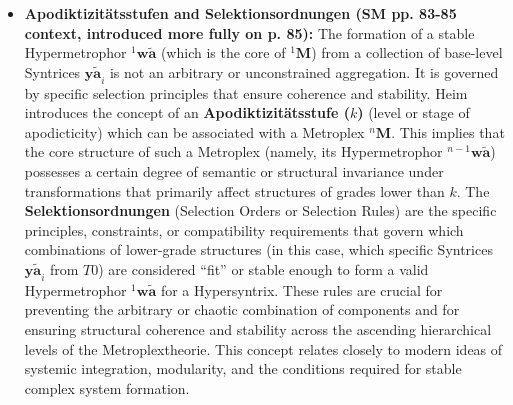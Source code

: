 \documentclass[12pt]{article}
\newcommand{\q}[1]{\enquote{#1}}
\newcommand{\syntrix}{\bm{y\widetilde{a}}}
\newcommand{\aspektivsystem}{P}
\newcommand{\syntrixtotalitaet}{T0}
\newcommand{\metroplex}[1]{{}^{#1}\mathbf{M}}
\newcommand{\hypersyntrix}{\metroplex{1}}
\newcommand{\hypermetrophor}[1]{{}^{#1}\mathbf{w\widetilde{a}}}
\begin{document}
\begin{itemize}
\begin{itemize}
\begin{itemize}
            \item \textbf{Exzenter (Eccentric Combination of Hypersyntrizen) (SM Eq. 20b, p. 83):} This describes an excentric connection that involves a Koppelung rule (\( K \), which implies \(K_m \neq 0\)) between a specific hyper-syndrome component (denoted \( (l,m) \)) of the Hypersyntrix \( \hypersyntrix_a \) and another hyper-syndrome component (denoted \( (m') \)) of the Hypersyntrix \( \hypersyntrix_b \). Heim's notation \( (l,m) \) and \( (m') \) here refers to specific elements within a hyper-syndrome at a certain level of \( \hypersyntrix_a \) being linked to a similar component in \( \hypersyntrix_b \).
            \begin{equation}
            {\hypersyntrix_a}^{(l,m)} \{ K \}^{(m')}, \overline{|\aspektivsystem_b|}, \hypersyntrix_c 
            \tag{20b}
            \end{equation}
            (Again, \( \aspektivsystem_b \) refers to the contextual aspect system. The \( K \) implies an excentric Korporator).
        \end{itemize}
    \end{itemize}

    \item \textbf{Apodiktizitätsstufen and Selektionsordnungen (SM pp. 83-85 context, introduced more fully on p. 85):}
    The formation of a stable Hypermetrophor \( \hypermetrophor{1} \) (which is the core of \( \hypersyntrix \)) from a collection of base-level Syntrices \( \syntrix_i \) is not an arbitrary or unconstrained aggregation. It is governed by specific selection principles that ensure coherence and stability. Heim introduces the concept of an \textbf{Apodiktizitätsstufe (\( k \))} (level or stage of apodicticity) which can be associated with a Metroplex \( \metroplex{n} \). This implies that the core structure of such a Metroplex (namely, its Hypermetrophor \( \hypermetrophor{n-1} \)) possesses a certain degree of semantic or structural invariance under transformations that primarily affect structures of grades lower than \( k \). The \textbf{Selektionsordnungen} (Selection Orders or Selection Rules) are the specific principles, constraints, or compatibility requirements that govern which combinations of lower-grade structures (in this case, which specific Syntrices \( \syntrix_i \) from \( \syntrixtotalitaet \)) are considered \q{fit} or stable enough to form a valid Hypermetrophor \( \hypermetrophor{1} \) for a Hypersyntrix. These rules are crucial for preventing the arbitrary or chaotic combination of components and for ensuring structural coherence and stability across the ascending hierarchical levels of the Metroplextheorie. This concept relates closely to modern ideas of systemic integration, modularity, and the conditions required for stable complex system formation.
\end{itemize}
\end{document}
